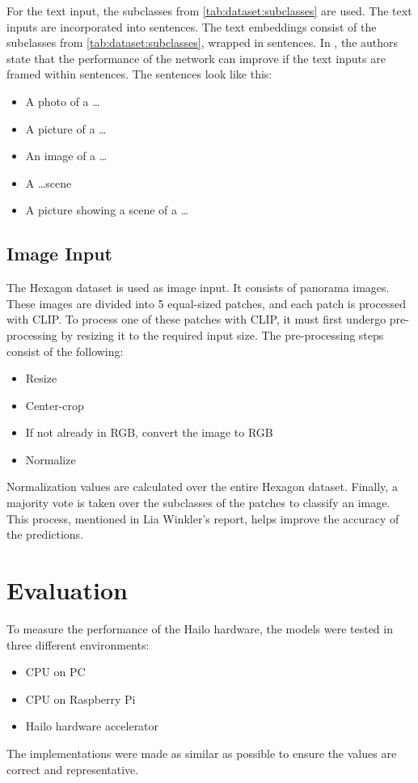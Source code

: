 For the text input, the subclasses from \cref{tab:dataset:subclasses} are used. 
The text inputs are incorporated into sentences.
The text embeddings consist of the subclasses from \cref{tab:dataset:subclasses}, wrapped in sentences.
In \cite{clip}, the authors state that the performance of the network can improve if the text inputs are framed within sentences.
The sentences look like this:
\begin{itemize}
    \item A photo of a \dots
    \item A picture of a \dots
    \item An image of a \dots
    \item A \dots scene
    \item A picture showing a scene of a \dots
\end{itemize}

\subsection{Image Input}
The Hexagon dataset is used as image input.
It consists of panorama images. 
These images are divided into 5 equal-sized patches, and each patch is processed with CLIP.
To process one of these patches with CLIP, it must first undergo pre-processing by resizing it to the required input size.
The pre-processing steps consist of the following:

\begin{itemize}
    \item Resize
    \item Center-crop
    \item If not already in RGB, convert the image to RGB
    \item Normalize
\end{itemize}

Normalization values are calculated over the entire Hexagon dataset.
Finally, a majority vote is taken over the subclasses of the patches to classify an image. 
This process, mentioned in Lia Winkler's report, helps improve the accuracy of the predictions.

\section{Evaluation}

To measure the performance of the Hailo hardware, the models were tested in three different environments:
\begin{itemize}
    \item CPU on PC
    \item CPU on Raspberry Pi
    \item Hailo hardware accelerator
\end{itemize}
The implementations were made as similar as possible to ensure the values are correct and representative. 

